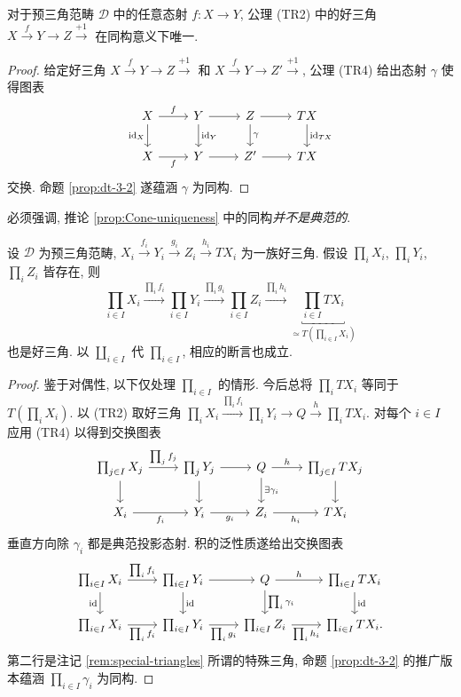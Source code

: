 \begin{corollary}\label{prop:Cone-uniqueness}
	对于预三角范畴 $\mathcal{D}$ 中的任意态射 $f: X \to Y$, 公理 (TR2) 中的好三角 $X \xrightarrow{f} Y \to Z \xrightarrow{+1}$ 在同构意义下唯一.
\end{corollary}
\begin{proof}
	给定好三角 $X \xrightarrow{f} Y \to Z \xrightarrow{+1}$ 和 $X \xrightarrow{f} Y \to Z' \xrightarrow{+1}$, 公理 (TR4) 给出态射 $\gamma$ 使得图表
	\[\begin{tikzcd}
		X \arrow[r, "f"] \arrow[d, "\identity_X"'] & Y \arrow[r] \arrow[d, "\identity_Y"] & Z \arrow[r] \arrow[d, "\gamma"] & TX \arrow[d, "\identity_{TX}"] \\
		X \arrow[r, "f"'] & Y \arrow[r] & Z' \arrow[r] & T X
	\end{tikzcd}\]
	交换. 命题 \ref{prop:dt-3-2} 遂蕴涵 $\gamma$ 为同构.
\end{proof}

必须强调, 推论 \ref{prop:Cone-uniqueness} 中的同构\emph{并不是典范的}.

\begin{lemma}\label{prop:dt-sum}
	设 $\mathcal{D}$ 为预三角范畴, $X_i \xrightarrow{f_i} Y_i \xrightarrow{g_i} Z_i \xrightarrow{h_i} TX_i$ 为一族好三角. 假设 $\prod_i X_i$, $\prod_i Y_i$, $\prod_i Z_i$ 皆存在, 则
	\[ \prod_{i \in I} X_i \xrightarrow{\prod_i f_i } \prod_{i \in I} Y_i \xrightarrow{\prod_i g_i} \prod_{i \in I} Z_i \xrightarrow{\prod_i h_i} \underbracket{\prod_{i \in I} TX_i}_{\simeq T(\prod_{i \in I} X_i)} \]
	也是好三角. 以 $\coprod_{i \in I}$ 代 $\prod_{i \in I}$, 相应的断言也成立.
\end{lemma}
\begin{proof}
	鉴于对偶性, 以下仅处理 $\prod_{i \in I}$ 的情形. 今后总将 $\prod_i TX_i$ 等同于 $T(\prod_i X_i)$. 以 (TR2) 取好三角 $\prod_i X_i \xrightarrow{\prod_i f_i} \prod_i Y_i \to Q \xrightarrow{h} \prod_i TX_i$. 对每个 $i \in I$ 应用 (TR4) 以得到交换图表
	\[\begin{tikzcd}
		\prod_{j \in I} X_j \arrow[r, "{\prod_j f_j}"] \arrow[d] & \prod_j Y_j \arrow[r] \arrow[d] & Q \arrow[r, "h"] \arrow[d, "{\exists \gamma_i}"] & \prod_{j \in I} TX_j \arrow[d] \\
		X_i \arrow[r, "{f_i}"'] & Y_i \arrow[r, "{g_i}"'] & Z_i \arrow[r, "{h_i}"'] & TX_i
	\end{tikzcd}\]
	垂直方向除 $\gamma_i$ 都是典范投影态射. 积的泛性质遂给出交换图表
	\[\begin{tikzcd}
		\prod_{i \in I} X_i \arrow[r, "{\prod_i f_i}"] \arrow[d, "\identity"'] & \prod_{i \in I} Y_i \arrow[r] \arrow[d, "\identity"] & Q \arrow[r, "h"] \arrow[d, "{\prod_i \gamma_i}"] & \prod_{i \in I} TX_i \arrow[d, "\identity"] \\
		\prod_{i \in I} X_i \arrow[r, "{\prod_i f_i}"'] & \prod_{i \in I} Y_i \arrow[r, "{\prod_i g_i}"'] & \prod_{i \in I} Z_i \arrow[r, "{\prod_i h_i}"'] & \prod_{i \in I} TX_i .
	\end{tikzcd}\]
	第二行是注记 \ref{rem:special-triangles} 所谓的特殊三角, 命题 \ref{prop:dt-3-2} 的推广版本蕴涵 $\prod_{i \in I} \gamma_i$ 为同构.
\end{proof}

